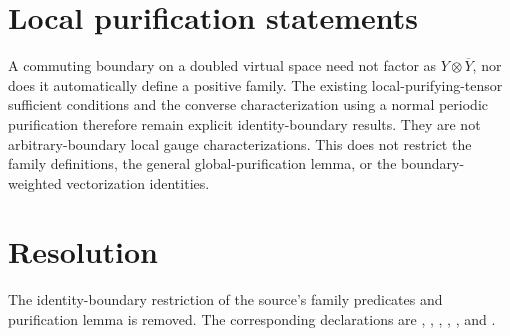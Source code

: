 \documentclass{article}
\begin{document}
\section{Local purification statements}
A commuting boundary on a doubled virtual space need not factor as
$Y\otimes\overline Y$, nor does it automatically define a positive family.
The existing local-purifying-tensor sufficient conditions and the converse
characterization using a normal periodic purification therefore remain
explicit identity-boundary results. They are not arbitrary-boundary local
gauge characterizations. This does not restrict the family definitions,
the general global-purification lemma, or the boundary-weighted
vectorization identities.

\section{Resolution}
The identity-boundary restriction of the source's family predicates and
purification lemma is removed. The corresponding declarations are
,
,
,
,
, and
.



\end{document}
